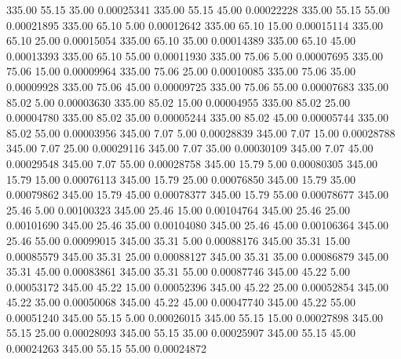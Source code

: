     335.00     55.15     35.00     0.00025341
    335.00     55.15     45.00     0.00022228
    335.00     55.15     55.00     0.00021895
    335.00     65.10      5.00     0.00012642
    335.00     65.10     15.00     0.00015114
    335.00     65.10     25.00     0.00015054
    335.00     65.10     35.00     0.00014389
    335.00     65.10     45.00     0.00013393
    335.00     65.10     55.00     0.00011930
    335.00     75.06      5.00     0.00007695
    335.00     75.06     15.00     0.00009964
    335.00     75.06     25.00     0.00010085
    335.00     75.06     35.00     0.00009928
    335.00     75.06     45.00     0.00009725
    335.00     75.06     55.00     0.00007683
    335.00     85.02      5.00     0.00003630
    335.00     85.02     15.00     0.00004955
    335.00     85.02     25.00     0.00004780
    335.00     85.02     35.00     0.00005244
    335.00     85.02     45.00     0.00005744
    335.00     85.02     55.00     0.00003956
    345.00      7.07      5.00     0.00028839
    345.00      7.07     15.00     0.00028788
    345.00      7.07     25.00     0.00029116
    345.00      7.07     35.00     0.00030109
    345.00      7.07     45.00     0.00029548
    345.00      7.07     55.00     0.00028758
    345.00     15.79      5.00     0.00080305
    345.00     15.79     15.00     0.00076113
    345.00     15.79     25.00     0.00076850
    345.00     15.79     35.00     0.00079862
    345.00     15.79     45.00     0.00078377
    345.00     15.79     55.00     0.00078677
    345.00     25.46      5.00     0.00100323
    345.00     25.46     15.00     0.00104764
    345.00     25.46     25.00     0.00101690
    345.00     25.46     35.00     0.00104080
    345.00     25.46     45.00     0.00106364
    345.00     25.46     55.00     0.00099015
    345.00     35.31      5.00     0.00088176
    345.00     35.31     15.00     0.00085579
    345.00     35.31     25.00     0.00088127
    345.00     35.31     35.00     0.00086879
    345.00     35.31     45.00     0.00083861
    345.00     35.31     55.00     0.00087746
    345.00     45.22      5.00     0.00053172
    345.00     45.22     15.00     0.00052396
    345.00     45.22     25.00     0.00052854
    345.00     45.22     35.00     0.00050068
    345.00     45.22     45.00     0.00047740
    345.00     45.22     55.00     0.00051240
    345.00     55.15      5.00     0.00026015
    345.00     55.15     15.00     0.00027898
    345.00     55.15     25.00     0.00028093
    345.00     55.15     35.00     0.00025907
    345.00     55.15     45.00     0.00024263
    345.00     55.15     55.00     0.00024872
